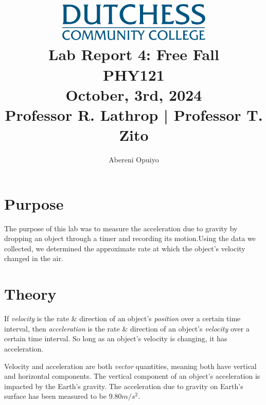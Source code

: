 \documentclass[a4paper,12pt]{article}
\title{
    \vspace{5cm} %
    \includegraphics[width=0.55\textwidth]{dutchess-logo-blue.png} \\ %
    \vspace{1cm} %
    \textbf{\Huge Lab Report 4: Free Fall} \\
    \vspace{1cm} %
    \large PHY121 \\
    \vspace{0.5cm} %
    \large	October, 3rd, 2024 \\ 
		\vspace{.5cm}
		\large Professor R. Lathrop | Professor T. Zito
}
\author{Abereni Opuiyo}
\date{}
\begin{document}
\maketitle
	\thispagestyle{plain}
\newpage




\setcounter{secnumdepth}{0}
\setcounter{page}{1}  %
\tableofcontents
\thispagestyle{fancy}
\newpage




\section{Purpose}
\vspace{-0.5cm}
\singlespacing
The purpose of this lab was to measure the acceleration due to gravity by dropping an object through a timer and recording its motion.Using the data we collected, we determined the approximate rate at which the object's velocity changed in the air.




\section{Theory}
\vspace{-0.5cm}
\singlespacing

\indent If \textit{velocity} is the rate \& direction of an object's \textit{position} over a certain time interval, then \textit{acceleration} is the rate \& direction of an object's \textit{velocity} over a certain time interval. So long as an object's velocity is changing, it has acceleration.\par 


Velocity and acceleration are both \textit{vector} quantities, meaning both have vertical and horizontal components. The vertical component of an object's acceleration is impacted by the Earth's gravity. The acceleration due to gravity on Earth's surface has been measured to be \textit{$9.80{m/s^2}$}. \par
\end{document}
